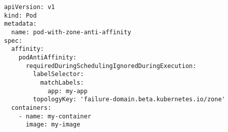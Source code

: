 \begin{verbatim}
apiVersion: v1
kind: Pod
metadata:
  name: pod-with-zone-anti-affinity
spec:
  affinity:
    podAntiAffinity:
      requiredDuringSchedulingIgnoredDuringExecution:
        labelSelector:
          matchLabels:
            app: my-app
        topologyKey: 'failure-domain.beta.kubernetes.io/zone'
  containers:
    - name: my-container
      image: my-image
\end{verbatim}